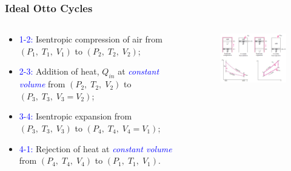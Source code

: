 \documentclass[10pt,compress]{beamer}
\begin{document}
\begin{frame}
 \frametitle{Ideal Otto Cycles}
  \begin{columns}
   \begin{column}[c]{0.4\linewidth}
    \begin{itemize}
     \item <1-> \textcolor{blue}{1-2:} Isentropic compression of air from $\left(P_{1},\;T_{1},\;V_{1}\right)$ to $\left(P_{2},\;T_{2},\;V_{2}\right)$;
     \item <2-> \textcolor{blue}{2-3:} Addition of heat, $Q_{in}$ at \textcolor{blue}{\it constant volume} from $\left(P_{2},\;T_{2},\;V_{2}\right)$ to $\left(P_{3},\;T_{3},\;V_{3}=V_{2}\right)$;
     \item <3-> \textcolor{blue}{3-4:} Isentropic expansion from $\left(P_{3},\;T_{3},\;V_{3}\right)$ to $\left(P_{4},\;T_{4},\;V_{4}=V_{1}\right)$;
     \item <4-> \textcolor{blue}{4-1:} Rejection of heat at \textcolor{blue}{\it constant volume} from $\left(P_{4},\;T_{4},\;V_{4}\right)$ to $\left(P_{1},\;T_{1},\;V_{1}\right)$. 
    \end{itemize}
   \end{column}
   \begin{column}[c]{0.6\linewidth}
    \begin{figure}%
     \begin{center}
      \includegraphics[width=7.5cm,clip]{./Pics/InternalCombustion_IdealOttoCycle2}
     \end{center}
    \end{figure}  
   \end{column}  
  \end{columns}
\end{frame}
\end{document}
